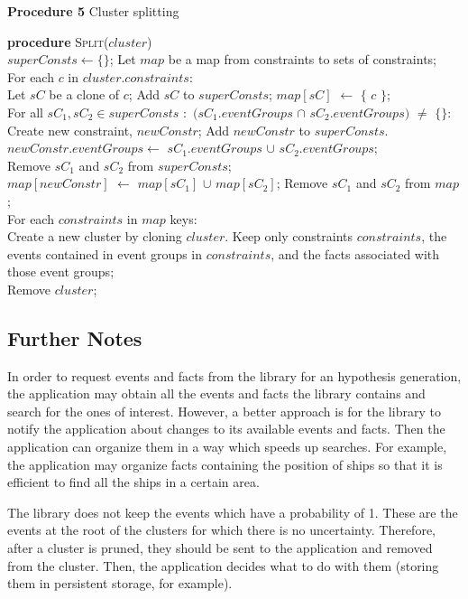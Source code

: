 \procedurespace
\begin{snippet}
\textbf{Procedure 5} Cluster splitting\\ \hline

\textbf{procedure} \textsc{Split}($cluster$)\\
$superConsts \leftarrow \{\}$; Let $map$ be a map from constraints to sets of constraints;\\
For each $c$ in $cluster.constraints$:\\
\tab Let $sC$ be a clone of $c$; Add $sC$ to $superConsts$; $map[sC]$ $\leftarrow$ $\{$ $c$ $\}$;\\
For all $sC_1, sC_2 \in superConsts$ $:$ $(sC_1.eventGroups$ $\cap$ $sC_2.eventGroups)$ $\neq$ $\{\}$:\\
\tab Create new constraint, $newConstr$; Add $newConstr$ to $superConsts$.\\
\tab $newConstr.eventGroups \leftarrow$ $sC_1.eventGroups$ $\cup$ $sC_2.eventGroups$;\\
\tab Remove $sC_1$ and $sC_2$ from $superConsts$;\\
\tab $map[newConstr]$ $\leftarrow$ $map[sC_1]$ $\cup$ $map[sC_2]$; Remove $sC_1$ and $sC_2$ from $map$;\\
For each $constraints$ in $map$ keys:\\
\tab Create a new cluster by cloning $cluster$. Keep only constraints $constraints$, the events contained in event groups in $constraints$, and the facts associated with those event groups;\\
Remove $cluster$;\\
\end{snippet}

\subsection{Further Notes}
In order to request events and facts from the library for an hypothesis generation, the application may obtain all the events and facts the library contains and search for the ones of interest. However, a better approach is for the library to notify the application about changes to its available events and facts. Then the application can organize them in a way which speeds up searches. For example, the application may organize facts containing the position of ships so that it is efficient to find all the ships in a certain area.

The library does not keep the events which have a probability of 1. These are the events at the root of the clusters for which there is no uncertainty. Therefore, after a cluster is pruned, they should be sent to the application and removed from the cluster. Then, the application decides what to do with them (storing them in persistent storage, for example).

